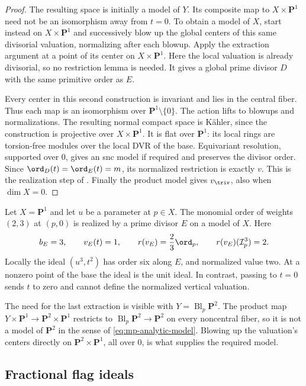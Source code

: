 \begin{proof}
The resulting space is initially a model of $Y$. Its composite
map to $X\times\mathbf P^1$ need not be an isomorphism away
from $t=0$. To obtain a model of $X$, start instead on
$X\times\mathbf P^1$ and successively blow up the global
centers of this same divisorial valuation, normalizing after
each blowup. Apply the extraction argument at a point of its
center on $X\times\mathbf P^1$. Here the local valuation is
already divisorial, so no restriction lemma is needed. It gives
a global prime divisor $D$ with the same primitive order as $E$.

Every center in this second construction is invariant and lies
in the central fiber. Thus each map is an isomorphism over
$\mathbf P^1\setminus\{0\}$. The action lifts to blowups and
normalizations. The resulting normal compact space is K\"ahler,
since the construction is projective over $X\times\mathbf P^1$.
It is flat over $\mathbf P^1$: its local rings are torsion-free
modules over the local DVR of the base. Equivariant resolution,
supported over $0$, gives an snc model if required and preserves
the divisor order. Since $\ord_D(t)=\ord_E(t)=m$, its normalized
restriction is exactly $v$. This is the realization step of
\cite[Proposition~2.5.11]{MPTropicalV2}. Finally the product
model gives $v_{\triv}$, also when $\dim X=0$.
\end{proof}

\begin{example}\label{ex:mp-vertical-normalization-model}
Let $X=\mathbf P^1$ and let $u$ be a parameter at $p\in X$.
The monomial order of weights $(2,3)$ at $(p,0)$ is realized
by a prime divisor $E$ on a model of $X$. Here
\[
 b_E=3,\qquad v_E(t)=1,\qquad
 r(v_E)=\frac23\ord_p,\qquad r(v_E)(\mathcal I_p^3)=2.
\]
Locally the ideal $(u^3,t^2)$ has order six along $E$, and
normalized value two. At a nonzero point of the base the ideal
is the unit ideal. In contrast, passing to $t=0$ sends $t$ to
zero and cannot define the normalized vertical valuation.

The need for the last extraction is visible with
$Y=\operatorname{Bl}_p\mathbf P^2$. The product map
$Y\times\mathbf P^1\to\mathbf P^2\times\mathbf P^1$ restricts
to $\operatorname{Bl}_p\mathbf P^2\to\mathbf P^2$ on every
noncentral fiber, so it is not a model of $\mathbf P^2$ in the
sense of \eqref{eq:mp-analytic-model}. Blowing up the valuation's
centers directly on $\mathbf P^2\times\mathbf P^1$, all over
$0$, is what supplies the required model.
\end{example}
\subsection{Fractional flag ideals}
\label{subsec:mp-dual-flags}

